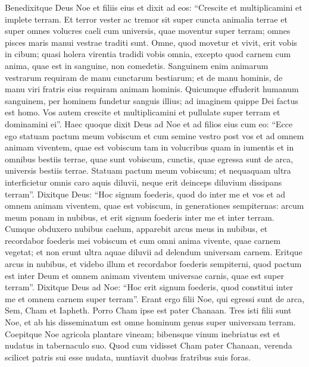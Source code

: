 \begin{biblechapter}
\begin{biblechapter}
\begin{biblechapter}
\begin{biblechapter}
\begin{biblechapter}
\begin{biblechapter}
\begin{biblechapter}
\begin{biblechapter}
\begin{biblechapter}
\verse Benedixitque Deus Noe et filiis eius et dixit ad eos: “Crescite et multiplicamini et implete terram.
\verse Et terror vester ac tremor sit super cuncta animalia terrae et super omnes volucres caeli cum universis, quae moventur super terram; omnes pisces maris manui vestrae traditi sunt. 
\verse Omne, quod movetur et vivit, erit vobis in cibum; quasi holera virentia tradidi vobis omnia, 
\verse excepto quod carnem cum anima, quae est in sanguine, non comedetis. 
\verse Sanguinem enim animarum vestrarum requiram de manu cunctarum bestiarum; et de manu hominis, de manu viri fratris eius requiram animam hominis.
 \verse Quicumque effuderit humanum sanguinem,
 per hominem fundetur sanguis illius;
 ad imaginem quippe Dei
 factus est homo.
 \verse Vos autem crescite et multiplicamini et pullulate super terram et dominamini ei”.
 \verse Haec quoque dixit Deus ad Noe et ad filios eius cum eo: 
\verse “Ecce ego statuam pactum meum vobiscum et cum semine vestro post vos 
\verse et ad omnem animam viventem, quae est vobiscum tam in volucribus quam in iumentis et in omnibus bestiis terrae, quae sunt vobiscum, cunctis, quae egressa sunt de arca, universis bestiis terrae. 
\verse Statuam pactum meum vobiscum; et nequaquam ultra interficietur omnis caro aquis diluvii, neque erit deinceps diluvium dissipans terram”.
 \verse Dixitque Deus: “Hoc signum foederis, quod do inter me et vos et ad omnem animam viventem, quae est vobiscum, in generationes sempiternas: 
\verse arcum meum ponam in nubibus, et erit signum foederis inter me et inter terram. 
\verse Cumque obduxero nubibus caelum, apparebit arcus meus in nubibus, 
\verse et recordabor foederis mei vobiscum et cum omni anima vivente, quae carnem vegetat; et non erunt ultra aquae diluvii ad delendum universam carnem. 
\verse Eritque arcus in nubibus, et videbo illum et recordabor foederis sempiterni, quod pactum est inter Deum et omnem animam viventem universae carnis, quae est super terram”.
 \verse Dixitque Deus ad Noe: “Hoc erit signum foederis, quod constitui inter me et omnem carnem super terram”.
 \verse Erant ergo filii Noe, qui egressi sunt de arca, Sem, Cham et Iapheth. Porro Cham ipse est pater Chanaan. 
\verse Tres isti filii sunt Noe, et ab his disseminatum est omne hominum genus super universam terram.
\verse Coepitque Noe agricola plantare vineam; 
\verse bibensque vinum inebriatus est et nudatus in tabernaculo suo. 
\verse Quod cum vidisset Cham pater Chanaan, verenda scilicet patris sui esse nudata, nuntiavit duobus fratribus suis foras. 

\end{biblechapter}
\end{biblechapter}
\end{biblechapter}
\end{biblechapter}
\end{biblechapter}
\end{biblechapter}
\end{biblechapter}
\end{biblechapter}
\end{biblechapter}
